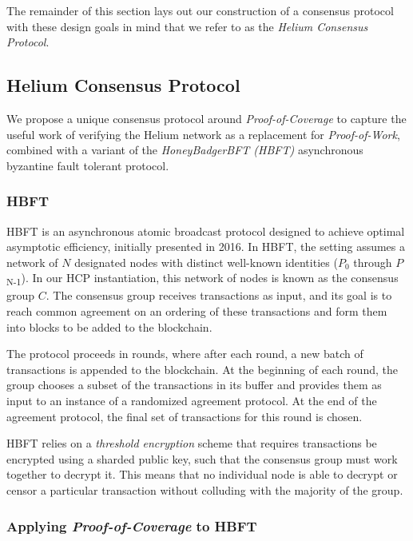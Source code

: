 \documentclass[10pt, nonatbib, nocopyrightspace, reprint]{sigplanconf}
\begin{document}
The remainder of this section lays out our construction of a consensus protocol with these design goals in mind that we refer to as the \emph{Helium Consensus Protocol}.

\subsection{Helium Consensus Protocol}

We propose a unique consensus protocol around \emph{Proof-of-Coverage} to capture the useful work of verifying the Helium network as a replacement for \emph{Proof-of-Work}, combined with a variant of the \emph{HoneyBadgerBFT (HBFT)} \cite{honeybadger} asynchronous byzantine fault tolerant protocol.

\subsubsection{HBFT}

HBFT is an asynchronous atomic broadcast protocol designed to achieve optimal asymptotic efficiency, initially presented in 2016. In HBFT, the setting assumes a network of $N$ designated nodes with distinct well-known identities ($P_0$ through $P$\textsubscript{N-1}). In our HCP instantiation, this network of nodes is known as the consensus group $C$. The consensus group receives transactions as input, and its goal is to reach common agreement on an ordering of these transactions and form them into blocks to be added to the blockchain.

The protocol proceeds in rounds, where after each round, a new batch of transactions is appended to the blockchain. At the beginning of each round, the group chooses a subset of the transactions in its buffer and provides them as input to an instance of a randomized agreement protocol. At the end of the agreement protocol, the final set of transactions for this round is chosen.

HBFT relies on a \emph{threshold encryption} scheme \cite{threshold-encryption} that requires transactions be encrypted using a sharded public key, such that the consensus group must work together to decrypt it. This means that no individual node is able to decrypt or censor a particular transaction without colluding with the majority of the group.

\subsubsection{Applying \emph{Proof-of-Coverage} to HBFT}
\end{document}
